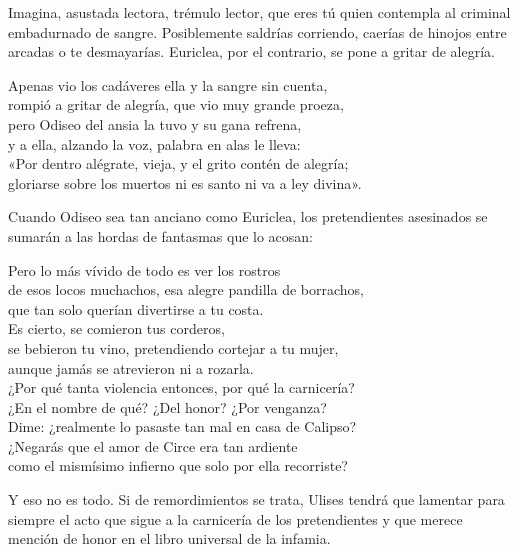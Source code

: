 Imagina, asustada lectora, trémulo lector, que eres tú quien contempla al criminal embadurnado de sangre. Posiblemente saldrías corriendo, caerías de hinojos entre arcadas o te desmayarías. Euriclea, por el contrario, se pone a gritar de alegría.

\begin{versocita}
Apenas vio los cadáveres ella y la sangre sin cuenta,\\
rompió a gritar de alegría, que vio muy grande proeza,\\
pero Odiseo del ansia la tuvo y su gana refrena,\\
y a ella, alzando la voz, palabra en alas le lleva:\\
«Por dentro alégrate, vieja, y el grito contén de alegría;\\
gloriarse sobre los muertos ni es santo ni va a ley divina».
\end{versocita}

Cuando Odiseo sea tan anciano como Euriclea, los pretendientes asesinados se sumarán a las hordas de fantasmas que lo acosan:

\begin{versopropio}
Pero lo más vívido de todo es ver los rostros\\
de esos locos muchachos, esa alegre pandilla de borrachos,\\
que tan solo querían divertirse a tu costa.\\
Es cierto, se comieron tus corderos,\\
se bebieron tu vino, pretendiendo cortejar a tu mujer,\\
aunque jamás se atrevieron ni a rozarla.\\
¿Por qué tanta violencia entonces, por qué la carnicería?\\
¿En el nombre de qué? ¿Del honor? ¿Por venganza?\\
Dime: ¿realmente lo pasaste tan mal en casa de Calipso?\\
¿Negarás que el amor de Circe era tan ardiente\\
como el mismísimo infierno que solo por ella recorriste?
\end{versopropio}

Y eso no es todo. Si de remordimientos se trata, Ulises tendrá que lamentar para siempre el acto que sigue a la carnicería de los pretendientes y que merece mención de honor en el libro universal de la infamia.
